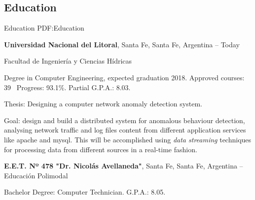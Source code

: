 \documentclass[letterpaper,MMMyyyy,nonstop]{simpleresumecv}
\begin{document}
\begin{body}


\section
{Education}
{Education}
{PDF:Education}

\textbf{Universidad Nacional del Litoral},
Santa Fe, Santa Fe, Argentina
\hfill
{} --
Today

\BulletItem Facultad de Ingeniería y Ciencias Hídricas
\begin{detail}
	\SubBulletItem
	Degree in Computer Engineering, expected graduation 2018.
	\SubBulletItem
	Approved courses: 39 \SubBulletSymbol\, Progress: 93.1\%.
	\SubBulletItem Partial G.P.A.: 8.03.

\end{detail}
\BulletItem	Thesis: Designing a computer network anomaly detection system.
\begin{detail}
	\SubBulletItem
	Goal: design and build a distributed system for anomalous behaviour detection, analysing network traffic and log files content from different application services like apache and mysql. This will be accomplished using \textit{data streaming} techniques for processing data from different sources in a real-time fashion.
	
\end{detail}

\BigGap
\textbf{E.E.T. Nº 478 "Dr. Nicolás Avellaneda"},
Santa Fe, Santa Fe, Argentina
\hfill
{} --
\BulletItem Educación Polimodal
\begin{detail}
	\SubBulletItem
	Bachelor Degree: Computer Technician.
	\SubBulletItem
	G.P.A.: 8.05.
\end{detail}

%
%



\end{body}
\end{document}
